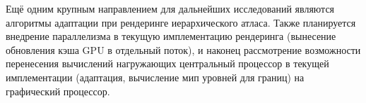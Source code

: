 \documentclass[12pt]{extarticle}
\begin{document}
Ещё одним крупным направлением для дальнейших исследований являются алгоритмы адаптации при рендеринге иерархического атласа. Также планируется внедрение параллелизма в текущую имплементацию рендеринга (вынесение обновления кэша GPU в отдельный поток), и наконец рассмотрение возможности перенесения вычислений нагружающих центральный процессор в текущей имплементации (адаптация, вычисление мип уровней для границ) на графический процессор.


\newpage

\end{document}
